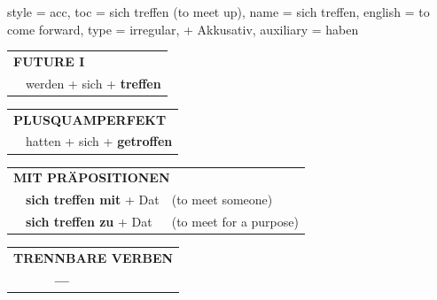 \begin{verbentry}{
  style = {acc},
  toc = {sich treffen (to meet up)},
  name = {sich treffen},
  english = {to come forward},
  type = {irregular, + Akkusativ},
  auxiliary = {haben}
}
\begin{tabular}{rl}
    \multicolumn{2}{l}{\textbf{FUTURE I} }\\
    &werden + sich + \textbf{treffen}\\
 
  \end{tabular}
\hfill
   \begin{tabular}{rl}
      \multicolumn{2}{l}{\textbf{PLUSQUAMPERFEKT}}\\
    &hatten + sich + \textbf{getroffen}\\
  \end{tabular}
  
\vspace{10pt}

   \begin{tabular}{lll}
      \multicolumn{3}{l}{\textbf{MIT PRÄPOSITIONEN}}\\
& \textbf{sich treffen mit} + Dat & (to meet someone)\\
& \textbf{sich treffen zu} + Dat & (to meet for a purpose)\\
  \end{tabular}
  \hfill
   \begin{tabular}{lll}
\multicolumn{3}{l}{\textbf{TRENNBARE VERBEN}}\\
& \textbf{---} & \\
\end{tabular}


 
  
  \vspace{-5pt}
\end{verbentry}

